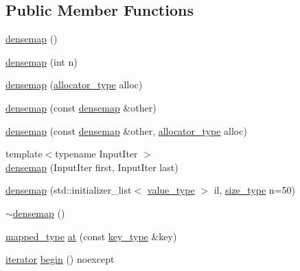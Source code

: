 \subsection*{Public Member Functions}
\begin{DoxyCompactItemize}
\item 
\hyperlink{classtheoria_1_1util_1_1densemap_a16acc8f341deb3ac951997def52d6bc5}{densemap} ()
\item 
\hyperlink{classtheoria_1_1util_1_1densemap_a28dea7cc32d7cee72cf330bdf3e3201c}{densemap} (int n)
\item 
\hyperlink{classtheoria_1_1util_1_1densemap_a4c32897f404f44c7de730637d09e18d5}{densemap} (\hyperlink{classtheoria_1_1util_1_1densemap_ae12f4688e504c8759e23759ad7272c94}{allocator\+\_\+type} alloc)
\item 
\hyperlink{classtheoria_1_1util_1_1densemap_a8c6d546ba72e0516685424cb5c4c2467}{densemap} (const \hyperlink{classtheoria_1_1util_1_1densemap}{densemap} \&other)
\item 
\hyperlink{classtheoria_1_1util_1_1densemap_ae8cbc01dc2418bffff40319a80df81e7}{densemap} (const \hyperlink{classtheoria_1_1util_1_1densemap}{densemap} \&other, \hyperlink{classtheoria_1_1util_1_1densemap_ae12f4688e504c8759e23759ad7272c94}{allocator\+\_\+type} alloc)
\item 
{\footnotesize template$<$typename Input\+Iter $>$ }\\\hyperlink{classtheoria_1_1util_1_1densemap_abd0a8736cb03cb0e4bbc7489a5274c78}{densemap} (Input\+Iter first, Input\+Iter last)
\item 
\hyperlink{classtheoria_1_1util_1_1densemap_a2fbff5aaf475fbd8492c9c766614517b}{densemap} (std\+::initializer\+\_\+list$<$ \hyperlink{classtheoria_1_1util_1_1densemap_a6d2419665695def56b2abbd849f74b08}{value\+\_\+type} $>$ il, \hyperlink{classtheoria_1_1util_1_1densemap_a133075e61db44e086c734c8a32ca6ab2}{size\+\_\+type} n=50)
\item 
\hyperlink{classtheoria_1_1util_1_1densemap_ac68e23ea5ed8af22b1772159537ab9ca}{$\sim$densemap} ()
\item 
\hyperlink{classtheoria_1_1util_1_1densemap_a8c1e5a57a1e76089bd675da3fa3347d8}{mapped\+\_\+type} \hyperlink{classtheoria_1_1util_1_1densemap_a8205a6321acfcf7492c71c4912c348df}{at} (const \hyperlink{classtheoria_1_1util_1_1densemap_afd285a46dc8f45b4b1556a656708d2a7}{key\+\_\+type} \&key)
\item 
\hyperlink{classtheoria_1_1util_1_1densemap_a4ee170442110252d3033534246f9677f}{iterator} \hyperlink{classtheoria_1_1util_1_1densemap_a511286991ffa72b606d52ae74668d5fe}{begin} () noexcept

\end{DoxyCompactItemize}
